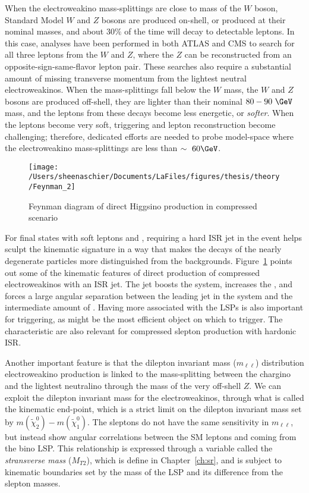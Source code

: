 When the electroweakino mass-splittings are close to mass of the $W$ boson, Standard Model $W$ and $Z$ bosons are produced on-shell, or produced at their nominal masses, and about $30\%$ of the time will decay to detectable leptons.  In this case, analyses have been performed in both ATLAS and CMS to search for all three leptons from the $W$ and $Z$, where the $Z$ can be reconstructed from an opposite-sign-same-flavor lepton pair.  These searches also require a substantial amount of missing transverse momentum from the lightest neutral electroweakinos.  When the mass-splittings fall below the $W$ mass, the $W$ and $Z$ bosons are produced off-shell, they are lighter than their nominal $80-90~\GeV$ mass, and the leptons from these decays become less energetic, or \textit{softer}.  When the leptons become very soft, triggering and lepton reconstruction become challenging; therefore, dedicated efforts are needed to probe model-space where the electroweakino mass-splittings are less than $\sim~60\GeV$. 
   \begin{figure}%
  \begin{center}
  \texttt{[image: /Users/sheenaschier/Documents/LaFiles/figures/thesis/theory/Feynman\_2]}
   \end{center}
 \caption{Feynman diagram of direct Higgsino production in compressed scenario}
 \label{fig:fn3}
 \end{figure}
For final states with soft leptons and \met{}, requiring a hard ISR jet in the event helps sculpt the kinematic signature in a way that makes the decays of the nearly degenerate particles more distinguished from the backgrounds.  Figure~\ref{fig:fn3} points out some of the kinematic features of direct production of compressed electroweakinos with an ISR jet.   The jet boosts the system, increases the \met, and forces a large angular separation between the leading jet in the system and the intermediate amount of \met.  Having more \met associated with the LSPs is also important for triggering, as \met might be the most efficient object on which to trigger.  The characteristic are also relevant for compressed slepton production with hardonic ISR.  

Another important feature is that the dilepton invariant mass ($m_{\ell\ell}$) distribution electroweakino production is linked to the mass-splitting between the chargino and the lightest neutralino through the mass of the very off-shell $Z$.  We can exploit the dilepton invariant mass for the electroweakinos, through what is called the kinematic end-point, which is a strict limit on the dilepton invariant mass set by $m(\tilde\chi_2^0)-m(\tilde\chi_1^0)$. The sleptons do not have the same sensitivity in $m_{\ell\ell}$, but instead show angular correlations between the SM leptons and \met{} coming from the bino LSP.  This relationship is expressed through a variable called the \textit{stransverse mass} ($M_{T2}$), which is define in Chapter~\ref{ch:sr}, and is subject to kinematic boundaries set by the mass of the LSP and its difference from the slepton masses.

